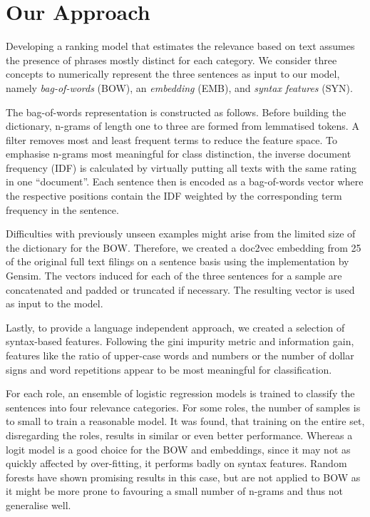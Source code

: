 \section{Our Approach}

Developing a ranking model that estimates the relevance based on text assumes the presence of phrases mostly distinct for each category.
We consider three concepts to numerically represent the three sentences as input to our model, namely \textit{bag-of-words} (BOW), an \textit{embedding} (EMB), and \textit{syntax features} (SYN).

The bag-of-words representation is constructed as follows. 
Before building the dictionary, n-grams of length one to three are formed from lemmatised tokens. 
A filter removes most and least frequent terms to reduce the feature space. To emphasise n-grams most meaningful for class distinction, the inverse document frequency (IDF) is calculated by virtually putting all texts with the same rating in one ``document''. 
Each sentence then is encoded as a bag-of-words vector where the respective positions contain the IDF weighted by the corresponding term frequency in the sentence.

Difficulties with previously unseen examples might arise from the limited size of the dictionary for the BOW.
Therefore, we created a doc2vec\cite{le2014distributed} embedding from 25 of the original full text filings on a sentence basis using the implementation by Gensim\cite{gensim}.
The vectors induced for each of the three sentences for a sample are concatenated and padded or truncated if necessary.
The resulting vector is used as input to the model.

Lastly, to provide a language independent approach, we created a selection of syntax-based features.
Following the gini impurity metric and information gain, features like the ratio of upper-case words and numbers or the number of dollar signs and word repetitions appear to be most meaningful for classification.

For each role, an ensemble of logistic regression models is trained to classify the sentences into four relevance categories.
For some roles, the number of samples is to small to train a reasonable model.
It was found, that training on the entire set, disregarding the roles, results in similar or even better performance.
Whereas a logit model is a good choice for the BOW and embeddings, since it may not as quickly affected by over-fitting, it performs badly on syntax features.
Random forests have shown promising results in this case, but are not applied to BOW as it might be more prone to favouring a small number of n-grams and thus not generalise well.

